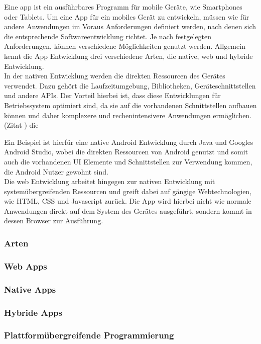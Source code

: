 Eine \gls{app} ist ein ausführbares Programm für mobile Geräte, wie Smartphones oder Tablets. Um eine App für ein mobiles Gerät zu entwickeln, müssen wie für andere Anwendungen im Voraus Anforderungen definiert werden, nach denen sich die entsprechende Softwareentwicklung richtet. Je nach festgelegten Anforderungen, können verschiedene Möglichkeiten genutzt werden. Allgemein kennt die App Entwicklung drei verschiedene Arten, die native, web und hybride Entwicklung.\\
In der nativen Entwicklung werden die direkten Ressourcen des Gerätes verwendet. Dazu gehört die Laufzeitumgebung, Bibliotheken, Geräteschnittstellen und andere APIs. Der Vorteil hierbei ist, dass diese Entwicklungen für Betriebssystem optimiert sind, da sie auf die vorhandenen Schnittstellen aufbauen können und daher komplexere und rechenintensivere Anwendungen ermöglichen.(Zitat ) die 


Ein Beispiel ist hierfür eine native Android Entwicklung durch Java und Googles Android Studio, wobei die direkten Ressourcen von Android genutzt und somit auch die vorhandenen UI Elemente und Schnittstellen zur Verwendung kommen, die Android Nutzer gewohnt sind.\\
Die web Entwicklung arbeitet hingegen zur nativen Entwicklung mit systemübergreifenden Ressourcen und greift dabei auf gängige Webtechnologien, wie HTML, CSS und Javascript zurück. Die App wird hierbei nicht wie normale Anwendungen direkt auf dem System des Gerätes ausgeführt, sondern kommt in dessen Browser zur Ausführung.

\subsubsection{Arten}

\subsubsection*{Web Apps}
\subsubsection*{Native Apps}
\subsubsection*{Hybride Apps}

\subsubsection{Plattformübergreifende Programmierung}

